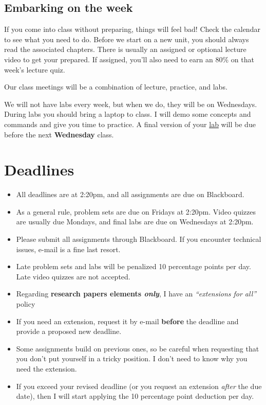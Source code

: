 \documentclass[
]{article}
\begin{document}
\hypertarget{class-meetings-m}{%
\subsection*{Embarking on the week}\label{class-meetings-m}}

If you come into class without preparing, things will feel bad! Check
the calendar to see what you need to do. Before we start on a new unit,
you should always read the associated chapters. There is usually an
assigned or optional lecture video to get your prepared. If assigned,
you'll also need to earn an 80\% on that week's lecture quiz.

Our class meetings will be a combination of lecture, practice, and labs.

We will not have labs every week, but when we do, they will be on
Wednesdays. During labs you should bring a laptop to class. I will demo
some concepts and commands and give you time to practice. A final
version of your \href{/assignment\#labs}{lab} will be due before the
next \textbf{Wednesday} class.

\hypertarget{deadlines-and-extensions}{%
\section*{Deadlines}\label{deadlines-and-extensions}}

\begin{itemize}
\item
  All deadlines are at 2:20pm, and all assignments are due on
  Blackboard.
\item
  As a general rule, problem sets are due on Fridays at 2:20pm. Video
  quizzes are usually due Mondays, and final labs are due on Wednesdays
  at 2:20pm.
\item
  Please submit all assignments through Blackboard. If you encounter
  technical issues, e-mail is a fine last resort.
\item
  Late problem sets and labs will be penalized 10 percentage points per
  day. Late video quizzes are not accepted.
\item
  Regarding \textbf{research papers elements \emph{only}}, I have an
  \emph{``extensions for all''} policy
\item
  If you need an extension, request it by e-mail \textbf{before} the
  deadline and provide a proposed new deadline.
\item
  Some assignments build on previous ones, so be careful when requesting
  that you don't put yourself in a tricky position. I don't need to know
  why you need the extension.
\item
  If you exceed your revised deadline (or you request an extension
  \emph{after} the due date), then I will start applying the 10
  percentage point deduction per day.
\end{itemize}
\end{document}

